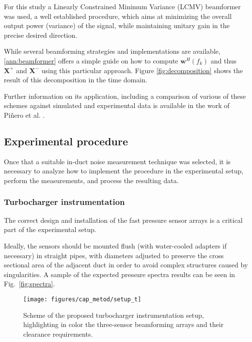 For this study a Linearly Constrained Minimum Variance (LCMV) beamformer was  used, a well established procedure, which aims at minimizing the overall output power (variance) of the signal, while maintaining unitary gain in the precise desired direction.

While several beamforming strategies and implementations are available, \ref{ann:beamformer} offers a simple guide on how to compute $\mathbf w^H(f_k)$ and thus $\mathbf X^+$ and $\mathbf X^-$ using this particular approach. Figure \ref{fig:decomposition} shows the result of this decomposition in the time domain.

Further information on its application, including a comparison of various of these schemes against simulated and experimental data is available in the work of Piñero et al. \cite{pinero2000estimation}.

\subsection{Experimental procedure}
\label{sec:experimental_procedure}

Once that a suitable in-duct noise measurement technique was  selected, it is necessary to analyze how to implement the procedure in the experimental setup, perform the measurements, and process the resulting data.

\subsubsection{Turbocharger instrumentation}
\label{sub:turbocharger_instrumentation}

The correct design and installation of the fast pressure sensor arrays is a critical part of the experimental setup.

Ideally, the sensors should be mounted flush (with water-cooled adapters if necessary) in straight pipes, with diameters adjusted to preserve the cross sectional area of the adjacent duct in order to avoid complex structures caused by singularities. A sample of the expected pressure spectra results can be seen in Fig.~\ref{fig:spectra}.

\begin{figure}[b!]
\centering
\texttt{[image: figures/cap\_metod/setup\_t]}
\caption[Scheme of the proposed turbocharger instrumentation setup]{Scheme of the proposed turbocharger instrumentation setup, highlighting in color the three-sensor beamforming arrays and their clearance requirements.}
\label{fig:setup_schem}
\end{figure}

